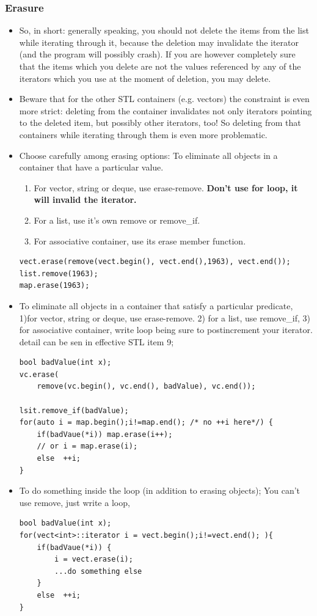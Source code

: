 \documentclass[a4paper,11pt,twoside]{book}
\begin{document}
\subsubsection{Erasure}
\begin{itemize}


\item So, in short: generally speaking, you should not delete the items from the list while iterating through it, because the deletion may invalidate the iterator (and the program will possibly crash). If you are however completely sure that the items which you delete are not the values referenced by any of the iterators which you use at the moment of deletion, you may delete.

\item Beware that for the other STL containers (e.g. vectors) the constraint is even more strict: deleting from the container invalidates not only iterators pointing to the deleted item, but possibly other iterators, too! So deleting from that containers while iterating through them is even more problematic.

\item Choose carefully among erasing options:  To eliminate all objects in a container that have a particular value.
\begin{enumerate}
\item For vector, string or deque, use erase-remove. \textbf{Don't use for loop, it will invalid the iterator.}
\item For a list, use it's own remove or remove\_if.
\item For associative container, use its erase member function.
\end{enumerate}

\begin{lstlisting}[numbers=none]
vect.erase(remove(vect.begin(), vect.end(),1963), vect.end());
list.remove(1963);
map.erase(1963);
\end{lstlisting}

\item  To eliminate all objects in a container that satisfy a particular predicate, 1)for vector, string or deque, use erase-remove. 2) for a list, use remove\_if, 3) for associative container, write loop being sure to postincrement your iterator. detail can be sen in effective STL item 9;
\begin{lstlisting}[numbers=none]
bool badValue(int x);
vc.erase(
	remove(vc.begin(), vc.end(), badValue), vc.end());

lsit.remove_if(badValue);
for(auto i = map.begin();i!=map.end(); /* no ++i here*/) {
	if(badVaue(*i)) map.erase(i++);
	// or i = map.erase(i);
	else  ++i;
}
\end{lstlisting}

\item  To do something inside the loop (in addition to erasing objects);  You can't use remove, just write a loop,
\begin{lstlisting}[numbers=none]
bool badValue(int x);
for(vect<int>::iterator i = vect.begin();i!=vect.end(); ){
	if(badVaue(*i)) {
		i = vect.erase(i);
		...do something else
	}
	else  ++i;
}
\end{lstlisting}

\end{itemize}
\end{document}
